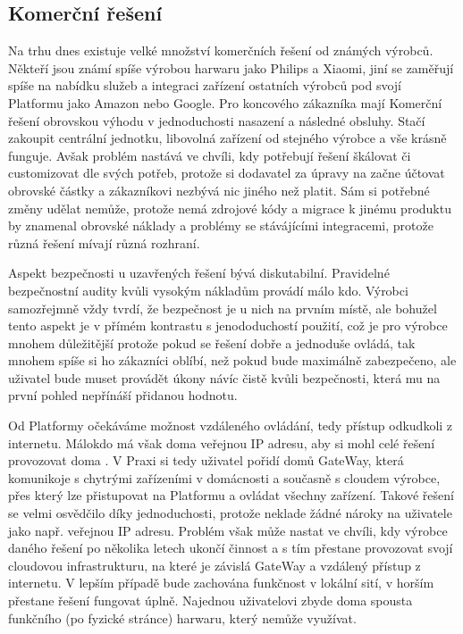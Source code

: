 \documentclass[thesis=B,czech]{FITthesis}[2019/12/23]
\begin{document}
\subsection{Komerční řešení} %
Na trhu dnes existuje velké množství komerčních řešení od známých výrobců. Někteří jsou známí spíše výrobou harwaru jako Philips a Xiaomi, jiní se zaměřují spíše na nabídku služeb a integraci zařízení ostatních výrobců pod svojí Platformu jako Amazon nebo Google. Pro koncového zákazníka mají Komerční řešení obrovskou výhodu v jednoduchosti nasazení a následné obsluhy. Stačí zakoupit centrální jednotku, libovolná zařízení od stejného výrobce a vše krásně funguje. Avšak problém nastává ve chvíli, kdy potřebují řešení škálovat či customizovat dle svých potřeb, protože si dodavatel za úpravy na  začne účtovat obrovské částky a zákazníkovi nezbývá nic jiného než platit. Sám si potřebné změny udělat nemůže, protože nemá zdrojové kódy a migrace k jinému produktu by znamenal obrovské náklady a problémy se stávájícími integracemi, protože různá řešení mívají různá rozhraní.

Aspekt bezpečnosti u uzavřených řešení bývá diskutabilní. Pravidelné bezpečnostní audity kvůli vysokým nákladům provádí málo kdo. Výrobci samozřejmně vždy tvrdí, že bezpečnost je u nich na prvním místě, ale bohužel tento aspekt je v přímém kontrastu s jenododuchostí použití, což je pro výrobce mnohem důležitější protože pokud se řešení dobře a jednoduše ovládá, tak mnohem spíše si ho zákazníci oblíbí, než pokud bude maximálně zabezpečeno, ale uživatel bude muset provádět úkony návíc čistě kvůli bezpečnosti, která mu na první pohled nepřínáší přidanou hodnotu.

Od Platformy očekáváme možnost vzdáleného ovládání, tedy přístup odkudkoli z internetu. Málokdo má však doma veřejnou IP adresu, aby si mohl celé řešení provozovat doma . V Praxi si tedy uživatel pořidí domů GateWay, která komunikoje s chytrými zařízeními v domácnosti a současně s cloudem výrobce, přes který lze přistupovat na Platformu a ovládat všechny zařízení. Takové řešení se velmi osvědčilo díky jednoduchosti, protože neklade žádné nároky na uživatele jako např. veřejnou IP adresu. Problém však může nastat ve chvíli, kdy výrobce daného řešení po několika letech ukončí činnost a s tím přestane provozovat svojí cloudovou infrastrukturu, na které je závislá GateWay a vzdálený přístup z internetu. V lepším případě bude zachována funkčnost v lokální sití, v horším přestane řešení fungovat úplně. Najednou uživatelovi zbyde doma spousta funkčního (po fyzické stránce) harwaru, který nemůže využívat.
\end{document}
